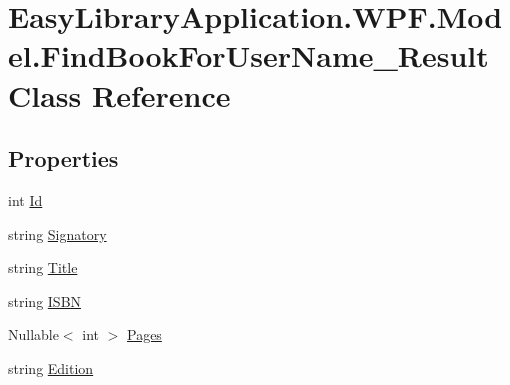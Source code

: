 \hypertarget{class_easy_library_application_1_1_w_p_f_1_1_model_1_1_find_book_for_user_name___result}{}\section{Easy\+Library\+Application.\+W\+P\+F.\+Model.\+Find\+Book\+For\+User\+Name\+\_\+\+Result Class Reference}
\label{class_easy_library_application_1_1_w_p_f_1_1_model_1_1_find_book_for_user_name___result}
\subsection*{Properties}
\begin{DoxyCompactItemize}
\item 
int \mbox{\hyperlink{class_easy_library_application_1_1_w_p_f_1_1_model_1_1_find_book_for_user_name___result_adb6004d22b061f7d3ac82202cbbf44c1}{Id}}
\item 
string \mbox{\hyperlink{class_easy_library_application_1_1_w_p_f_1_1_model_1_1_find_book_for_user_name___result_a0965c1a3a2d5e96faec20e0a4b392241}{Signatory}}
\item 
string \mbox{\hyperlink{class_easy_library_application_1_1_w_p_f_1_1_model_1_1_find_book_for_user_name___result_a0b491c436e40d49ff9f76977ecad4f23}{Title}}
\item 
string \mbox{\hyperlink{class_easy_library_application_1_1_w_p_f_1_1_model_1_1_find_book_for_user_name___result_a16934a9e71d58944561f483e2fdbe8c7}{I\+S\+BN}}
\item 
Nullable$<$ int $>$ \mbox{\hyperlink{class_easy_library_application_1_1_w_p_f_1_1_model_1_1_find_book_for_user_name___result_ad0d4101ead9717729bfce068c82b589e}{Pages}}
\item 
string \mbox{\hyperlink{class_easy_library_application_1_1_w_p_f_1_1_model_1_1_find_book_for_user_name___result_ac6a66c4a32e13246ae209c75a60c4bd6}{Edition}}

\end{DoxyCompactItemize}
